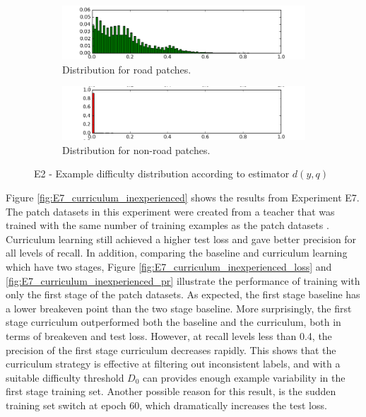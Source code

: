 \begin{figure}
\begin{subfigure}{0.48\textwidth}
\includegraphics[width=\linewidth]{figs/E2/E2-road-dist.png}
\caption{Distribution for road patches.} \label{fig:E2_difficulty_distribution_road}
\end{subfigure}
\hspace*{\fill} %
\begin{subfigure}{0.48\textwidth}
\includegraphics[width=\linewidth]{figs/E2/E2-non_road-dist.png}
\caption{Distribution for non-road patches.} \label{fig:E2_difficulty_distribution_nonroad}
\end{subfigure}
\hspace*{\fill} %
\caption{E2 - Example difficulty distribution according to estimator $d(y,q)$ } \label{fig:E2_difficulty_distribution}
\end{figure}

Figure \ref{fig:E7_curriculum_inexperienced} shows the results from Experiment E7. The patch datasets in this experiment were created from a teacher that was trained with the same number of training examples as the patch datasets . Curriculum learning still achieved a higher test loss and gave better precision for all levels of recall. In addition, comparing the baseline and curriculum learning which have two stages, Figure \ref{fig:E7_curriculum_inexperienced_loss} and \ref{fig:E7_curriculum_inexperienced_pr} illustrate the performance of training with only the first stage of the patch datasets. As expected, the first stage baseline has a lower breakeven point than the two stage baseline. More surprisingly, the first stage curriculum outperformed both the baseline and the curriculum, both in terms of breakeven and test loss. However, at recall levels less than 0.4, the precision of the first stage curriculum decreases rapidly. This shows that the curriculum strategy is effective at filtering out inconsistent labels, and with a suitable difficulty threshold $D_0$ can provides enough example variability in the first stage training set. Another possible reason for this result, is the sudden training set switch at epoch 60, which dramatically increases the test loss. \\

